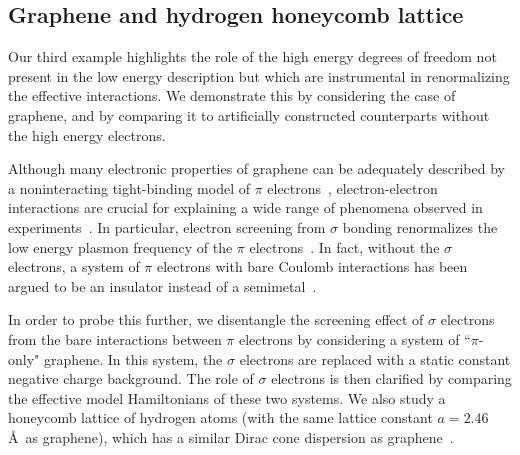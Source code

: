 \subsection{Graphene and hydrogen honeycomb lattice}
\label{subsection:graphene}
Our third example highlights the role of the high energy 
degrees of freedom not present in the low energy description 
but which are instrumental in renormalizing the effective interactions. 
We demonstrate this by considering the case of graphene, and by 
comparing it to artificially constructed counterparts without the high energy electrons. 

Although many electronic properties of graphene can be adequately 
described by a noninteracting tight-binding model of $\pi$ electrons~\cite{Castro2009}, 
electron-electron interactions are crucial for explaining 
a wide range of phenomena observed in experiments~\cite{Kotov2012}. 
In particular, electron screening from $\sigma$ bonding renormalizes 
the low energy plasmon frequency of the $\pi$ electrons~\cite{Zheng2016}. In fact, 
without the $\sigma$ electrons, a system of $\pi$ electrons with bare Coulomb interactions has been argued to be an 
insulator instead of a semimetal~\cite{DrutPRL2009, DrutPRB2009,  Smith2014, Zheng2016}. 

In order to probe this further, we disentangle the screening effect of $\sigma$ electrons from the bare interactions 
between $\pi$ electrons by considering a system of ``$\pi$-only" graphene. In this system, the 
$\sigma$ electrons are replaced with a static constant negative charge background. 
The role of $\sigma$ electrons is then clarified by comparing the effective model Hamiltonians of these two systems. 
We also study a honeycomb lattice of hydrogen atoms (with the same lattice constant $a=2.46$\AA~as graphene), 
which has a similar Dirac cone dispersion as graphene~\cite{Zheng2016}. 

